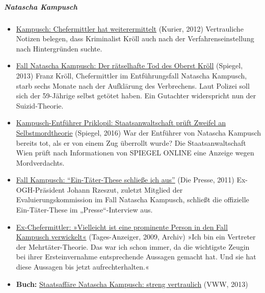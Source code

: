\hypertarget{natascha-kampusch}{%
\subparagraph{\texorpdfstring{\textbf{Natascha
Kampusch}}{Natascha Kampusch}}\label{natascha-kampusch}}

\begin{itemize}
\tightlist
\item
  \href{https://kurier.at/politik/kampusch-chefermittler-hat-weiterermittelt/731.884}{Kampusch:
  Chefermittler hat weiterermittelt} (Kurier, 2012) Vertrauliche Notizen
  belegen, dass Kriminalist Kröll auch nach der Verfahrenseinstellung
  nach Hintergründen suchte.
\item
  \href{http://www.spiegel.de/panorama/justiz/fall-kampusch-der-suizid-des-ermittlers-kroell-a-932107.html}{Fall
  Natascha Kampusch: Der rätselhafte Tod des Oberst Kröll} (Spiegel,
  2013) Franz Kröll, Chefermittler im Entführungsfall Natascha Kampusch,
  starb sechs Monate nach der Aufklärung des Verbrechens. Laut Polizei
  soll sich der 59-Jährige selbst getötet haben. Ein Gutachter
  widerspricht nun der Suizid-Theorie.
\item
  \href{http://www.spiegel.de/panorama/justiz/natascha-kampusch-neue-anzeige-wegen-mordes-zum-tod-von-priklopil-a-1079214.html}{Kampusch-Entführer
  Priklopil: Staatsanwaltschaft prüft Zweifel an Selbstmordtheorie}
  (Spiegel, 2016) War der Entführer von Natascha Kampusch bereits tot,
  als er von einem Zug überrollt wurde? Die Staatsanwaltschaft Wien
  prüft nach Informationen von SPIEGEL ONLINE eine Anzeige wegen
  Mordverdachts.
\item
  \href{https://diepresse.com/home/panorama/oesterreich/709987/Fall-Kampusch_EinTaeterThese-schliesse-ich-aus}{Fall
  Kampusch: ``Ein-Täter-These schließe ich aus''} (Die Presse, 2011)
  Ex-OGH-Präsident Johann Rzeszut, zuletzt Mitglied der
  Evaluierungskommission im Fall Natascha Kampusch, schließt die
  offizielle Ein-Täter-These im „Presse``-Interview aus.
\item
  \href{https://web.archive.org/web/20090815170242/http://www.tagesanzeiger.ch/panorama/vermischtes/Vielleicht-ist-eine-prominente-Person-in-den-Fall-Kampusch-verwickelt/story/27182028}{Ex-Chefermittler:
  »Vielleicht ist eine prominente Person in den Fall Kampusch
  verwickelt«} (Tages-Anzeiger, 2009, Archiv) »Ich bin ein Vertreter der
  Mehrtäter-Theorie. Das war ich schon immer, da die wichtigste Zeugin
  bei ihrer Ersteinvernahme entsprechende Aussagen gemacht hat. Und sie
  hat diese Aussagen bis jetzt aufrechterhalten.«
\item
  \textbf{Buch:}
  \href{https://www.amazon.de/Staatsaff\%C3\%A4re-Natascha-Kampusch-streng-vertraulich/dp/3981592301}{Staatsaffäre
  Natascha Kampusch: streng vertraulich} (VWW, 2013)
\end{itemize}

